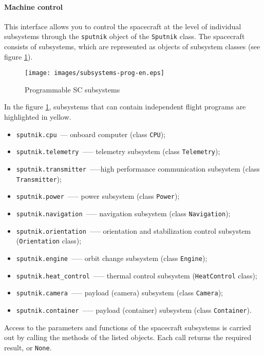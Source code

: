 \documentclass[12pt,a4paper]{article}
\begin{document}
\paragraph{Machine control}

This interface allows you to control the spacecraft at the level of individual subsystems through the \verb'sputnik' object of the \verb'Sputnik' class. The spacecraft consists of subsystems, which are represented as objects of subsystem classes (see figure \ref{Pic:subsystems-prog}).

\begin{figure}[tbh]
  \begin{center}
    \texttt{[image: images/subsystems-prog-en.eps]}
    \caption{Programmable SC subsystems}
    \label{Pic:subsystems-prog}
  \end{center}
\end{figure}

In the figure \ref{Pic:subsystems-prog}, subsystems that can contain independent flight programs are highlighted in yellow.

\begin{itemize}
\item \verb'sputnik.cpu'~--- onboard computer (class \verb'CPU');
\item \verb'sputnik.telemetry'~--— telemetry subsystem (class \verb'Telemetry');
\item \verb'sputnik.transmitter'~--—high performance communication subsystem (class \verb'Transmitter');
\item \verb'sputnik.power'~--— power subsystem (class \verb'Power');
\item \verb'sputnik.navigation'~--— navigation subsystem (class \verb'Navigation');
\item \verb'sputnik.orientation'~--— orientation and stabilization control subsystem (\verb'Orientation' class);
\item \verb'sputnik.engine'~--— orbit change subsystem (class \verb'Engine');
\item \verb'sputnik.heat_control'~--— thermal control subsystem (\verb'HeatControl' class);
\item \verb'sputnik.camera'~--— payload (camera) subsystem (class \verb'Camera');
\item \verb'sputnik.container'~--— payload (container) subsystem (class \verb'Container').
\end{itemize}

Access to the parameters and functions of the spacecraft subsystems is carried out by calling the methods of the listed objects. Each call returns the required result, or \verb'None'.
\end{document}
